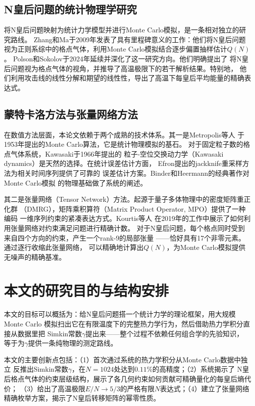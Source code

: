 \subsection{N皇后问题的统计物理学研究}

将N皇后问题映射为统计力学模型并进行Monte Carlo模拟，是一条相对独立的研究路线。
Zhang和Ma\cite{Zhang2009}于2009年发表了具有里程碑意义的工作：他们将N皇后问题
视为正则系综中的格点气体，利用Monte Carlo模拟结合逐步偏置抽样估计$Q(N)$。
Polson和Sokolov\cite{Polson2024}于2024年延续并深化了这一研究方向。他们明确提出了
将N皇后问题视为格点气体的视角，并推导了高温极限下的若干解析结果。特别地，
他们利用攻击线的线性分解和期望的线性性，导出了高温下每皇后平均能量的精确表达式。

\subsection{蒙特卡洛方法与张量网络方法}

在数值方法层面，本论文依赖于两个成熟的技术体系。其一是Metropolis等人
\cite{Metropolis1953}于1953年提出的Monte Carlo算法，它是统计物理模拟的基石。
对于固定粒子数的格点气体系统，Kawasaki\cite{Kawasaki1966}于1966年提出的
粒子-空位交换动力学（Kawasaki dynamics）是天然的选择。在统计误差估计方面，
Efron\cite{Efron1982}提出的jackknife重采样方法为相关时间序列提供了可靠的
误差估计方案。Binder和Heermann的经典著作\cite{Binder2010}对Monte Carlo模拟
的物理基础做了系统的阐述。

其二是张量网络（Tensor Network）方法。起源于量子多体物理中的密度矩阵重正化群
（DMRG），矩阵乘积算符（Matrix Product Operator, MPO）提供了一种编码
一维序列约束的紧凑表达方式\cite{Frowis2010}。Kourtis等人\cite{Kourtis2019}
在2019年的工作中展示了如何利用张量网络对约束满足问题进行精确计数。
对于N皇后问题，每个格点同时受到来自四个方向的约束，产生一个rank-9的局部张量
——恰好具有17个非零元素。通过逐行收缩此张量网络\cite{Xiang2024}，
可以精确地计算出$Q(N)$，为Monte Carlo模拟提供无噪声的精确基准。

\section{本文的研究目的与结构安排}

本文的目标可以概括为：给N皇后问题搭一个统计力学的理论框架，用大规模Monte Carlo
模拟扫出它在有限温度下的完整热力学行为，然后借助热力学积分直接从数据里把
Simkin常数$\gamma$提出来——整个过程不依赖任何组合学的先验知识，
等于为$\gamma$提供一条纯物理的测定路线。

本文的主要创新点包括：（1）首次通过系统的热力学积分从Monte Carlo数据中独立
反推出Simkin常数$\gamma$，在$N=1024$处达到$0.11\%$的高精度；（2）系统揭示了
N皇后格点气体的约束层级结构，展示了各几何约束如何贡献可精确量化的每皇后熵代价；
（3）给出了高温极限$E/N\to5/3$的严格有限$N$表达式；（4）建立了张量网络
精确枚举方案，揭示了N皇后转移矩阵的幂零性质。

